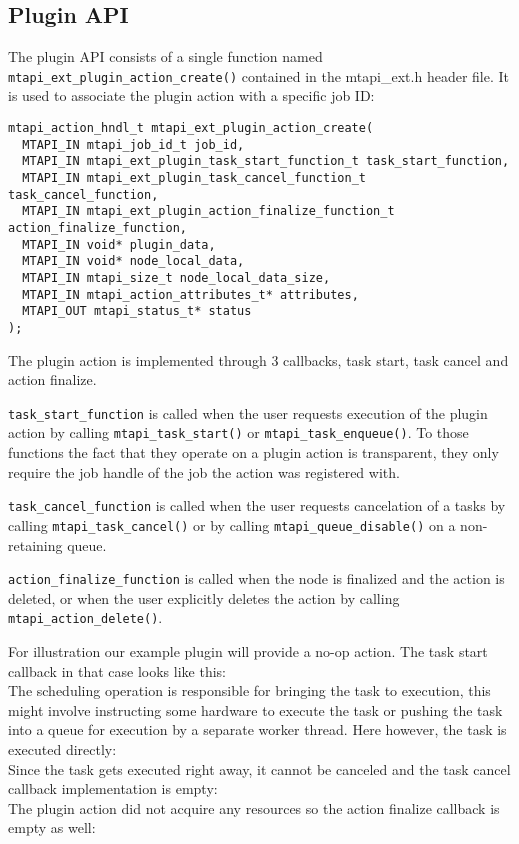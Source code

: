 \subsection{Plugin API}

The plugin API consists of a single function named \lstinline|mtapi_ext_plugin_action_create()| contained in the mtapi\_ext.h header file. It is used to associate the plugin action with a specific job ID:
\begin{lstlisting}
mtapi_action_hndl_t mtapi_ext_plugin_action_create(
  MTAPI_IN mtapi_job_id_t job_id,
  MTAPI_IN mtapi_ext_plugin_task_start_function_t task_start_function,
  MTAPI_IN mtapi_ext_plugin_task_cancel_function_t task_cancel_function,
  MTAPI_IN mtapi_ext_plugin_action_finalize_function_t action_finalize_function,
  MTAPI_IN void* plugin_data,
  MTAPI_IN void* node_local_data,
  MTAPI_IN mtapi_size_t node_local_data_size,
  MTAPI_IN mtapi_action_attributes_t* attributes,
  MTAPI_OUT mtapi_status_t* status
);
\end{lstlisting}
The plugin action is implemented through 3 callbacks, task start, task cancel and action finalize.

\lstinline|task_start_function| is called when the user requests execution of the plugin action by calling \lstinline|mtapi_task_start()| or \lstinline|mtapi_task_enqueue()|. To those functions the fact that they operate on a plugin action is transparent, they only require the job handle of the job the action was registered with.

\lstinline|task_cancel_function| is called when the user requests cancelation of a tasks by calling \lstinline|mtapi_task_cancel()| or by calling \lstinline|mtapi_queue_disable()| on a non-retaining queue.

\lstinline|action_finalize_function| is called when the node is finalized and the action is deleted, or when the user explicitly deletes the action by calling \lstinline|mtapi_action_delete()|.

For illustration our example plugin will provide a no-op action. The task start callback in that case looks like this:
%
\\
%
The scheduling operation is responsible for bringing the task to execution, this might involve instructing some hardware to execute the task or pushing the task into a queue for execution by a separate worker thread. Here however, the task is executed directly:
%
\\
%
Since the task gets executed right away, it cannot be canceled and the task cancel callback implementation is empty:
%
\\
%
The plugin action did not acquire any resources so the action finalize callback is empty as well:
%
\\
%

